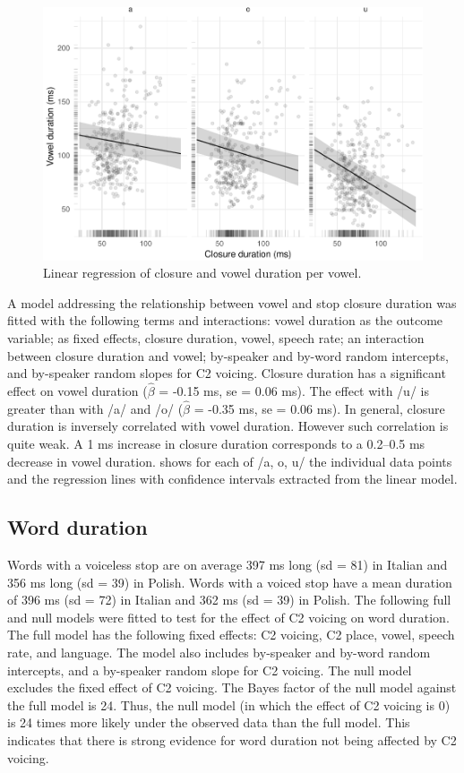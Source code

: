 \documentclass[preprint]{JASAnew}
\begin{document}
\begin{figure}
\includegraphics{2018-jasa_files/figure-latex/vow-clo-plot-1} \caption{Linear regression of closure and vowel duration per vowel.}\label{f:vow-clo-plot}
\end{figure}

A model addressing the relationship between vowel and stop closure
duration was fitted with the following terms and interactions: vowel
duration as the outcome variable; as fixed effects, closure duration,
vowel, speech rate; an interaction between closure duration and vowel;
by-speaker and by-word random intercepts, and by-speaker random slopes
for C2 voicing. Closure duration has a significant effect on vowel
duration (\(\hat{\beta}\) = -0.15 ms, se = 0.06 ms). The effect with /u/
is greater than with /a/ and /o/ (\(\hat{\beta}\) = -0.35 ms, se = 0.06
ms). In general, closure duration is inversely correlated with vowel
duration. However such correlation is quite weak. A 1 ms increase in
closure duration corresponds to a 0.2--0.5 ms decrease in vowel
duration.  shows for each of /a, o, u/ the
individual data points and the regression lines with confidence
intervals extracted from the linear model.

\hypertarget{word-duration}{%
\subsection{Word duration}\label{word-duration}}

Words with a voiceless stop are on average 397 ms long (sd = 81) in
Italian and 356 ms long (sd = 39) in Polish. Words with a voiced stop
have a mean duration of 396 ms (sd = 72) in Italian and 362 ms (sd = 39)
in Polish. The following full and null models were fitted to test for
the effect of C2 voicing on word duration. The full model has the
following fixed effects: C2 voicing, C2 place, vowel, speech rate, and
language. The model also includes by-speaker and by-word random
intercepts, and a by-speaker random slope for C2 voicing. The null model
excludes the fixed effect of C2 voicing. The Bayes factor of the null
model against the full model is 24. Thus, the null model (in which the
effect of C2 voicing is 0) is 24 times more likely under the observed
data than the full model. This indicates that there is strong evidence
for word duration not being affected by C2 voicing.
\end{document}
